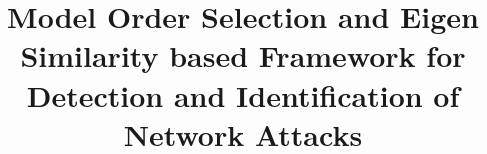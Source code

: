 \documentclass{bmcart}
\begin{document}
\begin{frontmatter}

\begin{fmbox}


\title{Model Order Selection and Eigen Similarity based Framework for Detection and Identification of Network Attacks}


\author[
	addressref={address1},                   %
	corref={address1},                       %
	email={tpbvieira@gmail.com} 				%
]{ }
\author[
   	addressref={address1},
   	email={???????????????}
]{ }
\author[
   	addressref={address1},
   	email={???????????????}
]{ }
\author[
   	addressref={address1,address2},
   	email={???????????????}
]{ }
\author[
   	addressref={address1},
   	email={???????????????}
]{ }



\end{fmbox}
\end{frontmatter}
\end{document}
